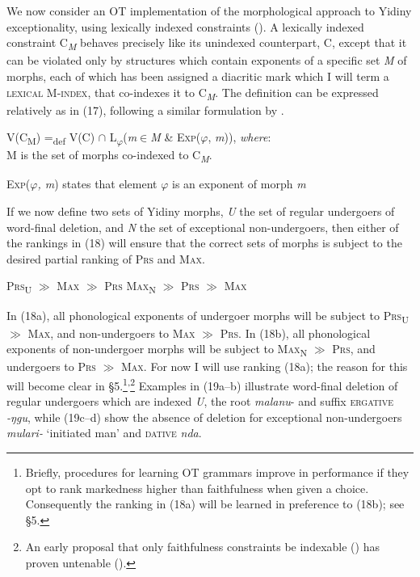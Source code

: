 \documentclass[output=paper,
modfonts
]{LSP/langsci}
\begin{document}
We now consider an OT implementation of the morphological approach to Yidiny exceptionality, using lexically indexed constraints (\citealt{pater2000r,pater2006,pater2009r}). A lexically indexed constraint C\textit{\textsubscript{M}} behaves precisely like its unindexed counterpart, C, except that it can be violated only by structures which contain exponents of a specific set \textit{M} of morphs, each of which has been assigned a diacritic mark which I will term a \textsc{lexical M-index}, that co-indexes it to C\textit{\textsubscript{M}}. The definition can be expressed relatively as in (17), following a similar formulation by \citet{finley2010}.

\ea 
V(\textsc{C}\textsc{\textsubscript{M}}) =\textsubscript{def} V(C) ${\cap}$ L\textsubscript{$\varphi$}(\textit{m}${\in}$\textit{M} \& \textsc{Exp}($\varphi$, \textit{m})), \textit{where}:\\
\textsc{M}\textsc{} is the set of morphs co-indexed to C\textit{\textsubscript{M}}.
 
\textsc{Exp}($\varphi $\textit{, m}) states that element $\varphi$ is an exponent of morph \textit{m}

\z

If we now define two sets of Yidiny morphs, \textit{U} the set of regular undergoers of word-final deletion, and \textit{N} the set of exceptional non-undergoers, then either of the rankings in (18) will ensure that the correct sets of morphs is subject to the desired partial ranking of \textsc{Prs} and \textsc{Max.} 

\ea
	\ea \textsc{Prs}\textsc{\textsubscript{U}} ${\gg}$ \textsc{Max} \textsc{${\gg}$} \textsc{Prs}
	\ex \textsc{Max}\textsc{\textsubscript{N}}\textsc{} \textsc{${\gg}$} \textsc{Prs} \textsc{${\gg}$} \textsc{Max}
	\z
\z

In (18a), all phonological exponents of undergoer morphs will be subject to \textsc{Prs}\textsc{\textsubscript{U}} ${\gg}$ \textsc{Max}, and non-undergoers to \textsc{Max} \textsc{${\gg}$} \textsc{Prs.} In (18b), all phonological exponents of non-undergoer morphs will be subject to \textsc{Max}\textsc{\textsubscript{N}}\textsc{} \textsc{${\gg}$} \textsc{Prs}, and undergoers to \textsc{Prs} \textsc{${\gg}$} \textsc{Max.} For now I will use ranking (18a); the reason for this will become clear in §5.\footnote{Briefly, procedures for learning OT grammars improve in performance if they opt to rank markedness higher than faithfulness when given a choice. Consequently the ranking in (18a) will be learned in preference to (18b); see §5.}\textsuperscript{,}\footnote{An early proposal that only faithfulness constraints be indexable (\citealt{benua1997,ito1999,fukazawa1999}) has proven untenable (\citealt{pater2000r,pater2006,flack2007r,flack2007li,inkelas2007,gouskova2007,mahanta2008,jurgec2010}).} Examples in (19a--b) illustrate word-final deletion of regular undergoers which are indexed \textit{U}, the root \textit{malanu}{}- and suffix \textsc{ergative} \textit{{}-ŋgu}, while (19c--d) show the absence of deletion for exceptional non-undergoers \textit{mulari-} `initiated man' and \textsc{dative} \textit{nda}. 
\end{document}

